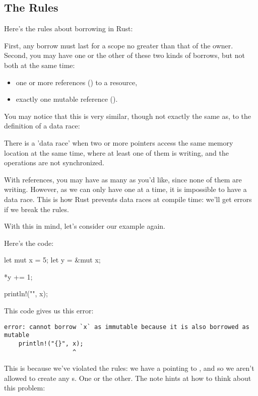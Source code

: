 \subsection*{The Rules}

Here's the rules about borrowing in Rust:

First, any borrow must last for a scope no greater than that of the owner. Second, you may have one or the other of these two 
kinds of borrows, but not both at the same time:

\begin{itemize}
  \item{one or more references () to a resource,}
  \item{exactly one mutable reference ().}
\end{itemize}

You may notice that this is very similar, though not exactly the same as, to the definition of a data race:

\begin{myquote}
There is a 'data race' when two or more pointers access the same memory location at the same time, where at least one of 
them is writing, and the operations are not synchronized.
\end{myquote}

With references, you may have as many as you'd like, since none of them are writing. However, as we can only have one 
at a time, it is impossible to have a data race. This is how Rust prevents data races at compile time: we'll get errors if we break 
the rules.

\blank

With this in mind, let's consider our example again.


Here's the code:

\begin{rustc}
let mut x = 5;
let y = &mut x;

*y += 1;

println!("{}", x);
\end{rustc}

This code gives us this error:

\begin{verbatim}
error: cannot borrow `x` as immutable because it is also borrowed as mutable
    println!("{}", x);
                   ^
\end{verbatim}

This is because we've violated the rules: we have a  pointing to \x, and so we aren't allowed to create any 
s. One or the other. The note hints at how to think about this problem:

